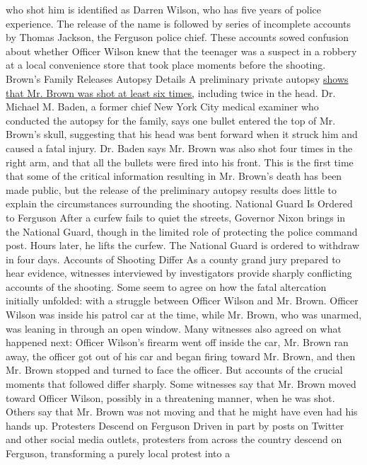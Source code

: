 who shot him is identified as Darren Wilson, who has five years of
police experience. The release of the name is followed by series of
incomplete accounts by Thomas Jackson, the Ferguson police chief. These
accounts sowed confusion about whether Officer Wilson knew that the
teenager was a suspect in a robbery at a local convenience store that
took place moments before the shooting. Brown's Family Releases Autopsy
Details A preliminary private autopsy
\href{http://stlouis.cbslocal.com/2014/08/17/report-michael-brown-autopsy-shows-teen-was-struck-at-least-6-times/}{shows
that Mr. Brown was shot at least six times,} including twice in the
head. Dr. Michael M. Baden, a former chief New York City medical
examiner who conducted the autopsy for the family, says one bullet
entered the top of Mr. Brown's skull, suggesting that his head was bent
forward when it struck him and caused a fatal injury. Dr. Baden says Mr.
Brown was also shot four times in the right arm, and that all the
bullets were fired into his front. This is the first time that some of
the critical information resulting in Mr. Brown's death has been made
public, but the release of the preliminary autopsy results does little
to explain the circumstances surrounding the shooting. National Guard Is
Ordered to Ferguson After a curfew fails to quiet the streets, Governor
Nixon brings in the National Guard, though in the limited role of
protecting the police command post. Hours later, he lifts the curfew.
The National Guard is ordered to withdraw in four days. Accounts of
Shooting Differ As a county grand jury prepared to hear evidence,
witnesses interviewed by investigators provide sharply conflicting
accounts of the shooting. Some seem to agree on how the fatal
altercation initially unfolded: with a struggle between Officer Wilson
and Mr. Brown. Officer Wilson was inside his patrol car at the time,
while Mr. Brown, who was unarmed, was leaning in through an open window.
Many witnesses also agreed on what happened next: Officer Wilson's
firearm went off inside the car, Mr. Brown ran away, the officer got out
of his car and began firing toward Mr. Brown, and then Mr. Brown stopped
and turned to face the officer. But accounts of the crucial moments that
followed differ sharply. Some witnesses say that Mr. Brown moved toward
Officer Wilson, possibly in a threatening manner, when he was shot.
Others say that Mr. Brown was not moving and that he might have even had
his hands up. Protesters Descend on Ferguson Driven in part by posts on
Twitter and other social media outlets, protesters from across the
country descend on Ferguson, transforming a purely local protest into a
